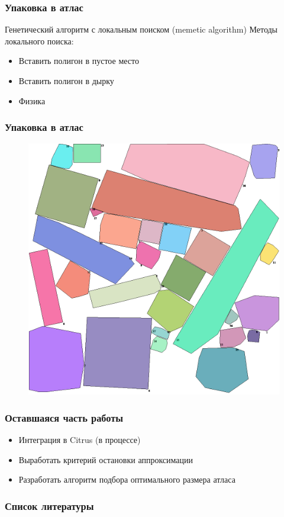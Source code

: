 \documentclass[10pt, unicode]{beamer}
\begin{document}
    \begin{frame}
        \frametitle{Упаковка в атлас}
        Генетический алгоритм с локальным поиском (memetic algorithm)
        Методы локального поиска:
        \begin{itemize}
            \item Вставить полигон в пустое место
            \item Вставить полигон в дырку
            \item Физика
        \end{itemize}
    \end{frame}
    \begin{frame}
        \frametitle{Упаковка в атлас}
        \begin{figure}
            \centering
            \includegraphics[width=\linewidth, height=.9\textheight, keepaspectratio]{PackExample.png}
        \end{figure}
    \end{frame}
    \begin{frame}
        \frametitle{Оставшаяся часть работы}
        \begin{itemize}
            \item Интеграция в Citrus (в процессе)
            \item Выработать критерий остановки аппроксимации
            \item Разработать алгоритм подбора оптимального размера атласа
        \end{itemize}
    \end{frame}
    \begin{frame} %
        \frametitle{Список литературы}
        
        
    \end{frame}
\end{document}
